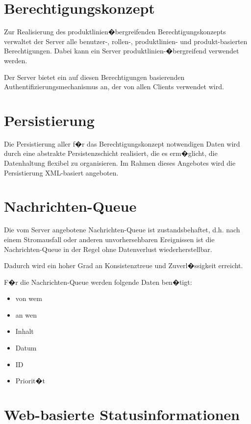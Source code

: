 \section{Berechtigungskonzept}

Zur Realisierung des produktlinien\-�bergreifenden Berechtigungskonzepts
verwaltet der Server alle benutzer-, rollen-, produktlinien- und
produkt-basierten Berechtigungen. Dabei kann ein Server produktlinien-�bergreifend
verwendet werden.\par
Der Server bietet ein auf diesen Berechtigungen basierenden
Authentifizierungsmechanismus an, der von allen Clients verwendet wird.

\section{Persistierung}

Die Persistierung aller f�r das Berechtigungskonzept notwendigen Daten wird
durch eine abstrakte Persistenzschicht realisiert, die es erm�glicht, die
Datenhaltung flexibel zu organisieren. Im Rahmen dieses Angebotes wird die
Persistierung XML-basiert angeboten.

\section{Nachrichten-Queue}

Die vom Server angebotene Nachrichten-Queue ist zustandsbehaftet, d.h. nach einem
Stromausfall oder anderen unvorhersehbaren Ereignissen ist die Nachrichten-Queue
in der Regel ohne Datenverlust wiederherstellbar.\par
Dadurch wird ein hoher Grad an Konsistenztreue und Zuverl�ssigkeit erreicht.\newline

F�r die Nachrichten-Queue werden folgende Daten ben�tigt:
\begin{itemize}
\item von wem
\item an wen
\item Inhalt
\item Datum
\item ID
\item Priorit�t
\end{itemize}



\section{Web-basierte Statusinformationen}

